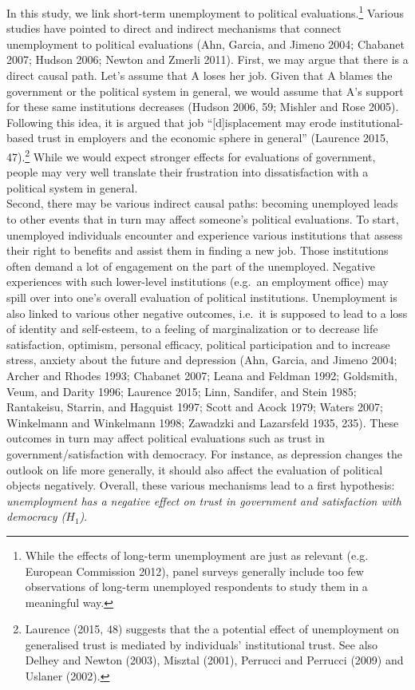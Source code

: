 \documentclass[12pt,]{article}
\let\rmarkdownfootnote\footnote%
\def\footnote{\protect\rmarkdownfootnote}
\begin{document}
In this study, we link short-term unemployment to political evaluations.\footnote{While the effects of long-term unemployment are just as relevant (e.g. European Commission 2012), panel surveys generally include too few observations of long-term unemployed respondents to study them in a meaningful way.} Various studies have pointed to direct and indirect mechanisms that connect unemployment to political evaluations (Ahn, Garcia, and Jimeno 2004; Chabanet 2007; Hudson 2006; Newton and Zmerli 2011). First, we may argue that there is a direct causal path. Let's assume that A loses her job. Given that A blames the government or the political system in general, we would assume that A's support for these same institutions decreases (Hudson 2006, 59; Mishler and Rose 2005). Following this idea, it is argued that job ``{[}d{]}isplacement may erode institutional-based trust in employers and the economic sphere in general'' (Laurence 2015, 47).\footnote{Laurence (2015, 48) suggests that the a potential effect of unemployment on generalised trust is mediated by individuals' institutional trust. See also Delhey and Newton (2003), Misztal (2001), Perrucci and Perrucci (2009) and Uslaner (2002).} While we would expect stronger effects for evaluations of government, people may very well translate their frustration into dissatisfaction with a political system in general.\\
Second, there may be various indirect causal paths: becoming unemployed leads to other events that in turn may affect someone's political evaluations. To start, unemployed individuals encounter and experience various institutions that assess their right to benefits and assist them in finding a new job. Those institutions often demand a lot of engagement on the part of the unemployed. Negative experiences with such lower-level institutions (e.g.~an employment office) may spill over into one's overall evaluation of political institutions. Unemployment is also linked to various other negative outcomes, i.e.~it is supposed to lead to a loss of identity and self-esteem, to a feeling of marginalization or to decrease life satisfaction, optimism, personal efficacy, political participation and to increase stress, anxiety about the future and depression (Ahn, Garcia, and Jimeno 2004; Archer and Rhodes 1993; Chabanet 2007; Leana and Feldman 1992; Goldsmith, Veum, and Darity 1996; Laurence 2015; Linn, Sandifer, and Stein 1985; Rantakeisu, Starrin, and Hagquist 1997; Scott and Acock 1979; Waters 2007; Winkelmann and Winkelmann 1998; Zawadzki and Lazarsfeld 1935, 235). These outcomes in turn may affect political evaluations such as trust in government/satisfaction with democracy. For instance, as depression changes the outlook on life more generally, it should also affect the evaluation of political objects negatively. Overall, these various mechanisms lead to a first hypothesis: \emph{unemployment has a negative effect on trust in government and satisfaction with democracy (\(H_{1}\))}.\\
\end{document}

